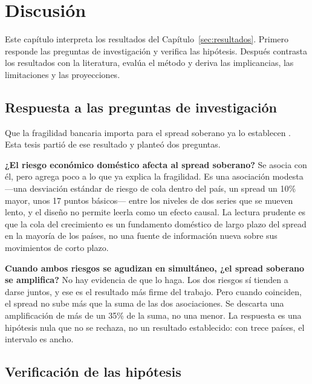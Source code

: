 \chapter{Discusión}
\label{sec:discusion}

Este capítulo interpreta los resultados del Capítulo~\ref{sec:resultados}. Primero responde las preguntas de investigación y verifica las hipótesis. Después contrasta los resultados con la literatura, evalúa el método y deriva las implicancias, las limitaciones y las proyecciones.

\section{Respuesta a las preguntas de investigación}
\label{sec:disc-preguntas}

Que la fragilidad bancaria importa para el spread soberano ya lo establecen \citet{Chari2024b}. Esta tesis partió de ese resultado y planteó dos preguntas.

\textbf{¿El riesgo económico doméstico afecta al spread soberano?} Se asocia con él, pero agrega poco a lo que ya explica la fragilidad. Es una asociación modesta ---una desviación estándar de riesgo de cola dentro del país, un spread un 10\% mayor, unos 17 puntos básicos--- entre los niveles de dos series que se mueven lento, y el diseño no permite leerla como un efecto causal. La lectura prudente es que la cola del crecimiento es un fundamento doméstico de largo plazo del spread en la mayoría de los países, no una fuente de información nueva sobre sus movimientos de corto plazo.

\textbf{Cuando ambos riesgos se agudizan en simultáneo, ¿el spread soberano se amplifica?} No hay evidencia de que lo haga. Los dos riesgos sí tienden a darse juntos, y ese es el resultado más firme del trabajo. Pero cuando coinciden, el spread no sube más que la suma de las dos asociaciones. Se descarta una amplificación de más de un 35\% de la suma, no una menor. La respuesta es una hipótesis nula que no se rechaza, no un resultado establecido: con trece países, el intervalo es ancho.

\section{Verificación de las hipótesis}
\label{sec:disc-hipotesis}

